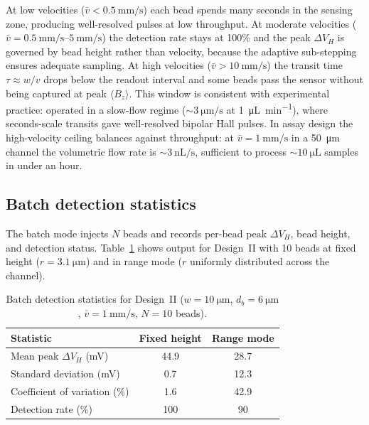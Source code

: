 \documentclass[pdflatex,sn-basic]{sn-jnl}
\theoremstyle{thmstyleone}
\theoremstyle{thmstyletwo}
\theoremstyle{thmstylethree}
\begin{document}
At low velocities ($\bar{v} < \SI{0.5}{\milli\meter\per\second}$) each bead spends many seconds in the sensing zone, producing well-resolved pulses at low throughput. At moderate velocities ($\bar{v} = \SIrange{0.5}{5}{\milli\meter\per\second}$) the detection rate stays at 100\% and the peak $\Delta V_H$ is governed by bead height rather than velocity, because the adaptive sub-stepping ensures adequate sampling. At high velocities ($\bar{v} > \SI{10}{\milli\meter\per\second}$) the transit time $\tau \approx w/v$ drops below the readout interval and some beads pass the sensor without being captured at peak $\langle B_z \rangle$. This window is consistent with experimental practice: \citet{aledealat2009} operated in a slow-flow regime (${\sim}\SI{3}{\micro\meter\per\second}$ at \SI{1}{\micro\liter\per\minute}), where seconds-scale transits gave well-resolved bipolar Hall pulses. In assay design the high-velocity ceiling balances against throughput: at $\bar{v} = \SI{1}{\milli\meter\per\second}$ in a \SI{50}{\micro\meter} channel the volumetric flow rate is ${\sim}\SI{3}{\nano\liter\per\second}$, sufficient to process ${\sim}\SI{10}{\micro\liter}$ samples in under an hour.

\subsection{Batch detection statistics}\label{sec:batch}

The batch mode injects $N$ beads and records per-bead peak $\Delta V_H$, bead height, and detection status. Table~\ref{tab:batch} shows output for Design~II with 10 beads at fixed height ($r = \SI{3.1}{\micro\meter}$) and in range mode ($r$ uniformly distributed across the channel).

\begin{table}[!htbp]
\caption{Batch detection statistics for Design~II ($w = \SI{10}{\micro\meter}$, $d_b = \SI{6}{\micro\meter}$, $\bar{v} = \SI{1}{\milli\meter\per\second}$, $N = 10$ beads).}
\label{tab:batch}
\centering
\small
\begin{tabular}{lcc}
\toprule
Statistic & Fixed height & Range mode \\
\midrule
Mean peak $\Delta V_H$ (\si{\milli\volt}) & 44.9 & 28.7 \\
Standard deviation (\si{\milli\volt}) & 0.7 & 12.3 \\
Coefficient of variation (\%) & 1.6 & 42.9 \\
Detection rate (\%) & 100 & 90 \\
\bottomrule
\end{tabular}
\end{table}
\end{document}
